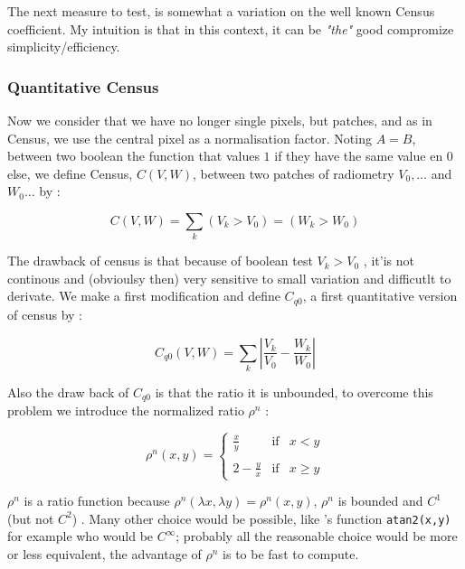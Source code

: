 \label{LIR:CQ}

The next measure to test, is somewhat a variation on the well known
Census coefficient. My intuition is that in this context, it can be \emph{"the"} good compromize
simplicity/efficiency.

\subsubsection{Quantitative Census}

Now we consider that we have no longer single pixels, but patches, and as
in Census, we use the central pixel as a normalisation factor. 
Noting $A = B$, between two boolean the function that values
$1$ if they have the same value en $0$ else, we define
Census, $C(V,W)$,  between two patches of radiometry $V_0, \dots$ and $W_0 \dots$ by :

\begin{equation}
      C(V,W)  = \sum_k (V_k > V_0) = (W_k>W_0)
\end{equation}


The drawback of census is  that because of boolean test $V_k > V_0$ , it'is
not continous and  (obvioulsy then) very sensitive to small variation and  difficutlt to derivate.
We make a first modification and define $C_{q0}$, a first quantitative version of census 
by :

\begin{equation}
      C_{q0} (V,W)  = \sum_k | \frac{V_k}{V_0} - \frac{W_k}{W_0} |
\end{equation}

Also the draw back of $C_{q0}$ is that  the ratio it is unbounded,
to overcome this problem we introduce the normalized ratio $\rho^n$ :

\begin{equation}
 \rho^n (x,y)  =
\left\{ \begin{array}{rcl}
\frac{x}{y} & \mbox{if}  & x<y\\
\\
2-\frac{y}{x} & \mbox{if}  & x \geq y
\end{array}\right.
\end{equation}

$\rho^n$ is a ratio function because $\rho^n(\lambda x, \lambda y) = \rho^n(x,y)$,
$\rho^n$ is bounded and  $C^1$ (but not $C^2$) . Many other choice would be possible, like \CPP's function {\tt atan2(x,y)} for
example who would be $C^{\infty}$; probably all the reasonable choice would be more or less equivalent, the advantage of $\rho^n$
is to be fast to compute.

